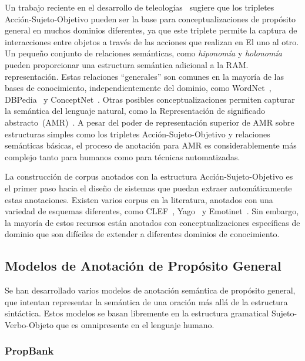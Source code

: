 Un trabajo reciente en el desarrollo de teleologías~\cite{teleologies} sugiere que los tripletes Acción-Sujeto-Objetivo pueden ser la base para conceptualizaciones de propósito general en muchos dominios diferentes, ya que este triplete permite la captura de interacciones entre objetos a través de las acciones que realizan en El uno al otro.
Un pequeño conjunto de relaciones semánticas, como \textit{hiponomía} y \textit{holonomía} pueden proporcionar una estructura semántica adicional a la RAM.
representación. Estas relaciones ``generales'' son comunes en la mayoría de las bases de conocimiento, independientemente del dominio, como WordNet~\cite{miller1998wordnet},
DBPedia~\cite{lehmann2015dbpedia} y ConceptNet~\cite{conceptnet}.
Otras posibles conceptualizaciones permiten capturar la semántica del lenguaje natural, como la Representación de significado abstracto~(AMR)~\cite{amr}. A pesar del poder de representación superior de AMR sobre estructuras simples como los tripletes Acción-Sujeto-Objetivo y relaciones semánticas básicas, el proceso de anotación para AMR es considerablemente más complejo tanto para humanos como para técnicas automatizadas.

La construcción de corpus anotados con la estructura Acción-Sujeto-Objetivo es el primer paso hacia el diseño de sistemas que puedan extraer automáticamente estas anotaciones. Existen varios corpus en la literatura, anotados con una variedad de esquemas diferentes, como CLEF~\cite{kelly2016overview}, Yago~\cite{suchanek2007yago} y Emotinet~\cite{Balahur2011}.
Sin embargo, la mayoría de estos recursos están anotados con conceptualizaciones específicas de dominio que son difíciles de extender a diferentes dominios de conocimiento.

\subsection{Modelos de Anotación de Propósito General}\label{sec:general}

Se han desarrollado varios modelos de anotación semántica de propósito general, que intentan representar la semántica de una oración más allá de la estructura sintáctica.
Estos modelos se basan libremente en la estructura gramatical Sujeto-Verbo-Objeto que es omnipresente en el lenguaje humano.

\subsubsection*{PropBank}

